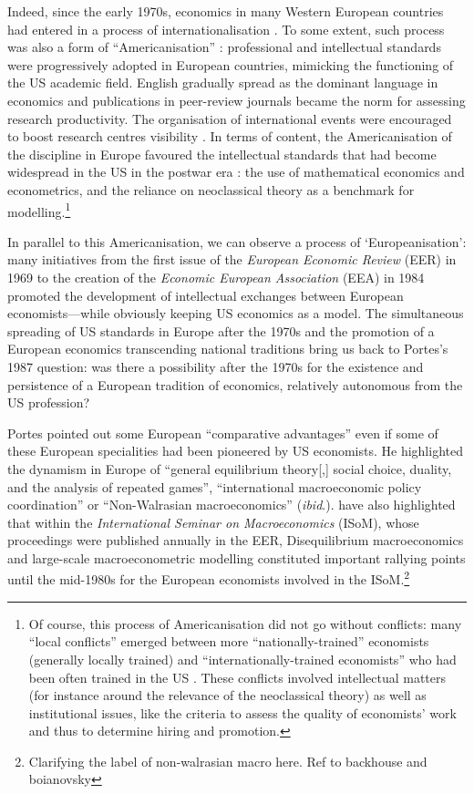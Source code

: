 \documentclass[]{elsarticle} %
\begin{document}
Indeed, since the early 1970s, economics in many Western European
countries had entered in a process of internationalisation
\citep[chapters 3 and 4]{fourcade2006, fourcade2009}. To some extent,
such process was also a form of ``Americanisation''
\citep{coats1996, goutsmedt2021}: professional and intellectual
standards were progressively adopted in European countries, mimicking
the functioning of the US academic field. English gradually spread as
the dominant language in economics \citep{sandelin1997} and publications
in peer-review journals became the norm for assessing research
productivity. The organisation of international events were encouraged
to boost research centres visibility
\citep{cherrier2021, goutsmedt2021}. In terms of content, the
Americanisation of the discipline in Europe favoured the intellectual
standards that had become widespread in the US in the postwar era
\citep{morgan1998}: the use of mathematical economics and econometrics,
and the reliance on neoclassical theory as a benchmark for
modelling.\footnote{Of course, this process of Americanisation did not
  go without conflicts: many ``local conflicts'' emerged between more
  ``nationally-trained'' economists (generally locally trained) and
  ``internationally-trained economists'' who had been often trained in
  the US \citep{fourcade2006}. These conflicts involved intellectual
  matters (for instance around the relevance of the neoclassical theory)
  as well as institutional issues, like the criteria to assess the
  quality of economists' work and thus to determine hiring and
  promotion.}

In parallel to this Americanisation, we can observe a process of
`Europeanisation': many initiatives from the first issue of the
\emph{European Economic Review} (EER) in 1969 to the creation of the
\emph{Economic European Association} (EEA) in 1984 promoted the
development of intellectual exchanges between European
economists---while obviously keeping US economics as a model. The
simultaneous spreading of US standards in Europe after the 1970s and the
promotion of a European economics transcending national traditions bring
us back to Portes's 1987 question: was there a possibility after the
1970s for the existence and persistence of a European tradition of
economics, relatively autonomous from the US profession?

Portes pointed out some European ``comparative advantages''
\citep[1332]{portes1987} even if some of these European specialities had
been pioneered by US economists. He highlighted the dynamism in Europe
of ``general equilibrium theory{[},{]} social choice, duality, and the
analysis of repeated games'', ``international macroeconomic policy
coordination'' or ``Non-Walrasian macroeconomics'' (\emph{ibid}.).
\citet{goutsmedt2021} have also highlighted that within the
\emph{International Seminar on Macroeconomics} (ISoM), whose proceedings
were published annually in the EER, Disequilibrium macroeconomics and
large-scale macroeconometric modelling constituted important rallying
points until the mid-1980s for the European economists involved in the
ISoM.\footnote{Clarifying the label of non-walrasian macro here. Ref to
  backhouse and boianovsky}
\end{document}
